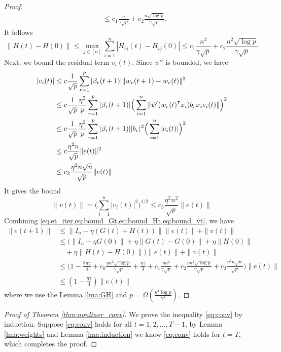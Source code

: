 \begin{proof}
\begin{equation*}
\begin{aligned}
    &\leq c_1 \frac{n}{\gamma\sqrt p} + c_2\frac{n\sqrt{\log p}}{\gamma\sqrt p}.
\end{aligned}
\end{equation*}
It follows
\begin{equation}\label{eq:bound_Ht}
    \|H(t)-H(0)\| \leq \max_{j \in [n]}\sum_{i=1}^n|H_{ij}(t) - H_{ij}(0)| \leq c_1 \frac{n^2}{\gamma\sqrt p} + c_2\frac{n^2\sqrt{\log p}}{\gamma\sqrt p}
\end{equation}
Next, we bound the residual term $v_i(t)$. Since $\psi''$ is bounded, we have
\begin{equation*}
\begin{aligned}
    |v_i(t)|
    &\leq c\frac{1}{\sqrt p}\sum_{r=1}^p|\beta_r(t+1)|\|w_r(t+1)-w_r(t)\|^2 \\
    &\leq c\frac{1}{\sqrt p}\frac{\eta^2}{p}\sum_{r=1}^p|\beta_r(t+1)|\Big(\sum_{i=1}^n\|\psi'(w_r(t)\transpose x_i)b_rx_ie_i(t)\|\Big)^2 \\
    &\leq c\frac{1}{\sqrt p}\frac{\eta^2}{p}\sum_{r=1}^p|\beta_r(t+1)||b_r|^2\Big(\sum_{i=1}^n|e_i(t)|\Big)^2 \\
    &\leq c\frac{\eta^2n}{\sqrt p}\|e(t)\|^2 \\
    &\leq c_3\frac{\eta^2n\sqrt n}{\sqrt p}\|e(t)\|
\end{aligned}
\end{equation*}
It gives the bound
\begin{equation}\label{eq:bound_vt}
    \|v(t)\| =\Big(\sum_{i=1}^n|v_i(t)|^2\Big)^{1/2} \leq c_3\frac{\eta^2n^2}{\sqrt p}\|e(t)\|
\end{equation}
Combining \cref{eq:et_iter,eq:bound_Gt,eq:bound_Ht,eq:bound_vt}, we have
\begin{equation*}
\begin{aligned}
\|e(t+1)\| 
&\leq \|I_n-\eta (G(t)+H(t))\|\|e(t)\|+\|v(t)\| \\
&\leq \Big(\|I_n-\eta G(0)\|+\eta\|G(t)-G(0)\|+\eta\|H(0)\| \\
&\quad +\eta\|H(t)-H(0)\|\Big)\|e(t)\| + \|v(t)\| \\
&\leq \Big( 1-\frac{3\eta\gamma}{4}+c_0\frac{\eta n^2\sqrt{\log p}}{\gamma\sqrt p}+\frac{\eta\gamma}{4}+c_1\frac{\eta n^2}{\gamma\sqrt p} + c_2\frac{\eta n^2\sqrt{\log p}}{\gamma\sqrt p}+c_3\frac{\eta^2n\sqrt n}{\sqrt p}\Big)\|e(t)\|  \\
&\leq(1-\frac{\eta\gamma}{4})\|e(t)\|
\end{aligned}
\end{equation*}
where we use the Lemma \ref{lma:GH} and $p=\Omega(\frac{n^4\log p}{\gamma^4})$.
\end{proof}

\begin{proof}[Proof of Theorem \ref{thm:nonliner_conv}]
We prove the inequality \eqref{eq:conv} by induction. Suppose \eqref{eq:conv} holds for all $t=1,2,...,T-1$, by Lemma \ref{lma:weights} and Lemma \ref{lma:induction} we know \eqref{eq:conv} holds for $t=T$, which completes the proof.
\end{proof}
